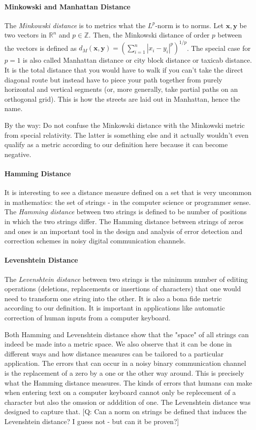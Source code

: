 \paragraph{Minkowski and Manhattan Distance}
The \emph{Minkowski distance} is to metrics what the $L^p$-norm is to norms. Let $\mathbf{x,y}$ be two vectors in $\mathbb{R}^n$ and $p \in \mathbb{Z}$. Then, the Minkowski distance of order $p$ between the vectors is defined as $d_M(\mathbf{x,y}) = (\sum_{i=1}^n |x_i - y_i|^p )^{1/p}$. The special case for $p=1$ is also called Manhattan distance or city block distance or taxicab distance. It is the total distance that you would have to walk if you can't take the direct diagonal route but instead have to piece your path together from purely horizontal and vertical segments (or, more generally, take partial paths on an orthogonal grid). This is how the streets are laid out in Manhattan, hence the name. 

\medskip
By the way: Do not confuse the Minkowski distance with the Minkowski metric from special relativity. The latter is something else and it actually wouldn't even qualify as a metric according to our definition here because it can become negative.

\paragraph{Hamming Distance} 
It is interesting to see a distance measure defined on a set that is very uncommon in mathematics: the set of strings - in the computer science or programmer sense. The \emph{Hamming distance} between two strings is defined to be number of positions in which the two strings differ. The Hamming distance between strings of zeros and ones is an important tool in the design and analysis of error detection and correction schemes in noisy digital communication channels. 

\paragraph{Levenshtein Distance} 
The \emph{Levenshtein distance} between two strings is the minimum number of editing operations (deletions, replacements or insertions of characters) that one would need to transform one string into the other. It is also a bona fide metric according to our definition. It is important in applications like automatic correction of human inputs from a computer keyboard.

\medskip
Both Hamming and Levenshtein distance show that the "space" of all strings can indeed be made into a metric space. We also observe that it can be done in different ways and how distance measures can be tailored to a particular application. The errors that can occur in a noisy binary communication channel is the replacement of a zero by a one or the other way around. This is precisely what the Hamming distance measures. The kinds of errors that humans can make when entering text on a computer keyboard cannot only be replecement of a character but also the omssion or adddition of one. The Levenshtein distance was designed to capture that. [Q: Can a norm on strings be defined that induces the Levenshtein distance? I guess not - but can it be proven?] 

